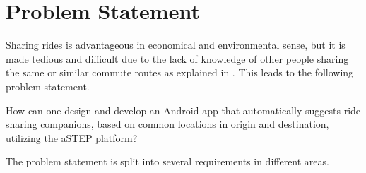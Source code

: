 \section{Problem Statement}
Sharing rides is advantageous in economical and environmental sense, but it is made tedious and   difficult due to the lack of knowledge of other people sharing the same or similar commute routes as explained in \cite{doi:10.1080/01441647.2011.621557}. This leads to the following problem statement.

{\addtolength{\leftskip}{10mm}\addtolength{\rightskip}{10mm}\noindent\hrulefill\it

\noindent How can one design and develop an Android app that automatically suggests ride sharing companions, based on common locations in origin and destination, utilizing the aSTEP platform? 

\noindent\hrulefill

}

The problem statement is split into several requirements in different areas.